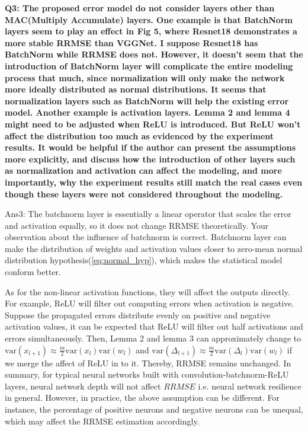 \textbf{Q3: The proposed error model do not consider layers other than MAC(Multiply Accumulate) layers. One example is that BatchNorm layers seem to play an effect in Fig 5, where Resnet18 demonstrates a more stable RRMSE than VGGNet. I suppose Resnet18 has BatchNorm while RRMSE does not. However, it doesn’t seem that the introduction of BatchNorm layer will complicate the entire modeling process that much, since normalization will only make the network more ideally distributed as normal distributions. It seems that normalization layers such as BatchNorm will help the existing error model. Another example is activation layers. Lemma 2 and lemma 4 might need to be adjusted when ReLU is introduced. But ReLU won’t affect the distribution too much as evidenced by the experiment results. It would be helpful if the author can present the assumptions more explicitly, and discuss how the introduction of other layers such as normalization and activation can affect the modeling, and more importantly, why the experiment results still match the real cases even though these layers were not considered throughout the modeling.}

Ans3: The batchnorm layer is essentially a linear operator that scales the error and activation equally, so it does not change RRMSE theoretically. Your observation about the influence of batchnorm is correct. Batchnorm layer can make the distribution of weights and activation values closer to zero-mean normal distribution hypothesis(\autoref{eq:normal_hyp}), which makes the statistical model conform better.

As for the non-linear activation functions, they will affect the outputs directly. For example, ReLU will filter out computing errors when activation is negative. Suppose the propagated errors distribute evenly on positive and negative activation values, it can be expected that ReLU will filter out half activations and errors simultaneously. Then, Lemma 2 and lemma 3 can approximately change to $\mathrm{var}(x_{l+1})\approx \frac{m}{2}\mathrm{var}(x_l)\mathrm{var}(w_l)$ and $\mathrm{var}(\Delta_{l+1})\approx \frac{m}{2}\mathrm{var}(\Delta_l)\mathrm{var}(w_l)$ if we merge the affect of ReLU in to it. Thereby, RRMSE remains unchanged. In summary, for typical neural networks built with convolution-batchnorm-ReLU layers, neural network depth will not affect $RRMSE$ i.e. neural network resilience in general. However, in practice, the above assumption can be different. For instance, the percentage of positive neurons and negative neurons can be unequal, which may affect the RRMSE estimation accordingly. 

